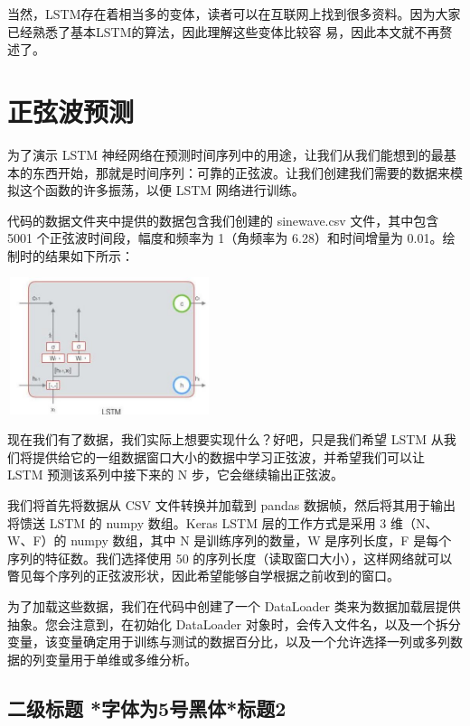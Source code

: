 \documentclass[10.5pt,compsoc]{CjC}
\theoremstyle{mystyle}
\begin{document}
当然，LSTM存在着相当多的变体，读者可以在互联网上找到很多资料。因为大家已经熟悉了基本LSTM的算法，因此理解这些变体比较容 易，因此本文就不再赘述了。\\

\section{正弦波预测}
为了演示 LSTM 神经网络在预测时间序列中的用途，让我们从我们能想到的最基本的东西开始，那就是时间序列：可靠的正弦波。让我们创建我们需要的数据来模拟这个函数的许多振荡，以便 LSTM 网络进行训练。

代码的数据文件夹中提供的数据包含我们创建的 sinewave.csv 文件，其中包含 5001 个正弦波时间段，幅度和频率为 1（角频率为 6.28）和时间增量为 0.01。绘制时的结果如下所示：

\includegraphics[width=6cm, height=4cm]{images/2022_05_03_e4231fc9c1842f38b0acg-04}

现在我们有了数据，我们实际上想要实现什么？好吧，只是我们希望 LSTM 从我们将提供给它的一组数据窗口大小的数据中学习正弦波，并希望我们可以让 LSTM 预测该系列中接下来的 N 步，它会继续输出正弦波。

我们将首先将数据从 CSV 文件转换并加载到 pandas 数据帧，然后将其用于输出将馈送 LSTM 的 numpy 数组。Keras LSTM 层的工作方式是采用 3 维（N、W、F）的 numpy 数组，其中 N 是训练序列的数量，W 是序列长度，F 是每个序列的特征数。我们选择使用 50 的序列长度（读取窗口大小），这样网络就可以瞥见每个序列的正弦波形状，因此希望能够自学根据之前收到的窗口。

为了加载这些数据，我们在代码中创建了一个 DataLoader 类来为数据加载层提供抽象。您会注意到，在初始化 DataLoader 对象时，会传入文件名，以及一个拆分变量，该变量确定用于训练与测试的数据百分比，以及一个允许选择一列或多列数据的列变量用于单维或多维分析。

{\heiti \subsection{二级标题 *字体为5号黑体*标题2} }
\end{document}
